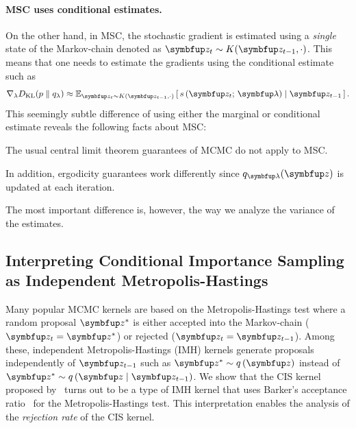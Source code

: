 \paragraph{MSC uses conditional estimates.}
On the other hand, in MSC, the stochastic gradient is estimated using a \textit{single} state of the Markov-chain denoted as \(\vz_t \sim K(\vz_{t-1}, \cdot)\).
This means that one needs to estimate the gradients using the conditional estimate such as
\begin{align}
  \nabla_{\lambda} \DKL{p}{q_{\lambda}} \approx \Esub{\vz_t \sim K(\vz_{t-1},\cdot)}{s\,(\vz_t;\, \vlambda) \mid \vz_{t-1}}.
\end{align}
This seemingly subtle difference of using either the marginal or conditional estimate reveals the following facts about MSC:
\begin{enumerate*}[label=(\roman*)]
\item The usual central limit theorem guarantees of MCMC do not apply to MSC.
\item In addition, ergodicity guarantees work differently since \(q_{\vlambda}(\vz)\) is updated at each iteration.
\end{enumerate*}
The most important difference is, however, the way we analyze the variance of the estimates.

\subsection{Interpreting Conditional Importance Sampling as Independent Metropolis-Hastings}\label{section:cis_imh}
Many popular MCMC kernels are based on the Metropolis-Hastings test where a random proposal \(\vz^*\) is either accepted into the Markov-chain (\(\vz_{t} = \vz^*\)) or rejected (\(\vz_t = \vz_{t-1}\)).
Among these, independent Metropolis-Hastings (IMH) kernels generate proposals independently of \(\vz_{t-1}\) such as \(\vz^* \sim q\,(\vz)\) instead of \(\vz^* \sim q\,(\vz\mid\vz_{t-1})\).%
We show that the CIS kernel proposed by~\citet{NEURIPS2020_b2070693} turns out to be a type of IMH kernel that uses Barker's acceptance ratio~\citep{barker_monte_1965} for the Metropolis-Hastings test.
This interpretation enables the analysis of the \textit{rejection rate} of the CIS kernel.

